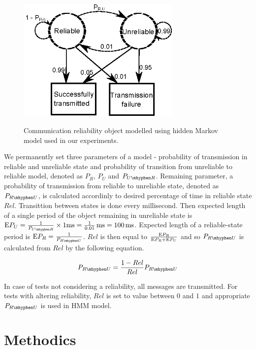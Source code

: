 \begin{figure}
\begin{center}
\includegraphics[width=8cm]{img/hmm_reliability.eps}
\end{center}
\caption{\footnotesize Communication reliability object modelled using hidden Markov model
used in our experiments.}{\footnotesize}
\label{fig_hmm_reliability}
\end{figure}

We permanently set three parameters of a model - probability of transmission in reliable and
unreliable state and probability of transition from unreliable to reliable model, denoted as
$P_{R}$, $P_{U}$ and $P_{U\mhyphen R}$. Remaining
parameter, a probability of transmission from reliable to unreliable state, denoted as
$P_{R \mhyphen U}$, is calculated accordinly to desired percentage of time in reliable state
$Rel$.
Transittion between states is done every millisecond. Then expected length of a single period
of the object remaining in unreliable state is $\mathrm{E}P_U = {1 \over P_{U\mhyphen R}} \times 1
\mathrm{ms} = {1
\over 0.01}\,\mathrm{ms} = 100\,\mathrm{ms}$. Expected length of a reliable-state period is
$\mathrm{E}P_R = {1 \over
P_{R\mhyphen U}}$. $Rel$ is then equal to $\mathrm{E}P_R \over \mathrm{E}P_R + \mathrm{E}P_U$ and so 
$P_{R\mhyphen U}$ is
calculated from $Rel$ by the following equation.

\begin{equation}
P_{R\mhyphen U} = { 1 - Rel \over Rel } P_{R\mhyphen U}
\end{equation}

In case of tests not considering a reliability, all messages are transmitted. For tests with
altering reliability, $Rel$ is set to value between $0$ and $1$ and appropriate $P_{R\mhyphen
U}$ is used in HMM model.



\section{Methodics}
\label{sec_methodics}

